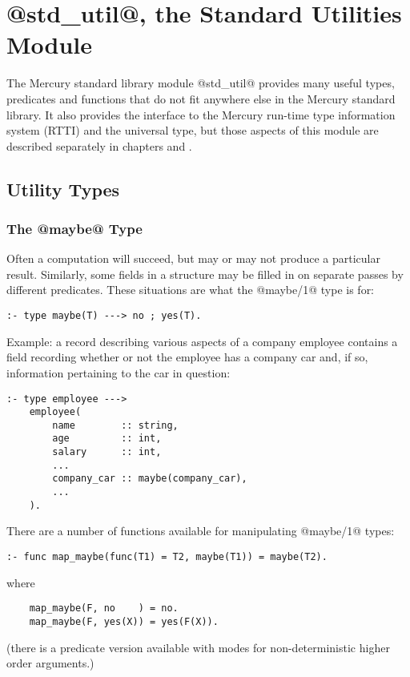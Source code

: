 


\chapter{@std\_util@, the Standard Utilities Module}

The Mercury standard library module @std_util@ provides many useful
types, predicates and functions that do not fit anywhere else in the
Mercury standard library.  It also provides the interface to the Mercury
run-time type information system (RTTI) and the universal type, but
those aspects of this module are described separately in chapters
 and .

\section{Utility Types}

\subsection{The @maybe@ Type}

Often a computation will succeed, but may or may not produce a
particular result.  Similarly, some fields in a structure may be filled
in on separate passes by different predicates.  These situations are
what the @maybe/1@ type is for:
\begin{verbatim}
:- type maybe(T) ---> no ; yes(T).
\end{verbatim}
Example: a record describing various aspects of a company employee
contains a field recording whether or not the employee has a company car
and, if so, information pertaining to the car in question:
\begin{verbatim}
:- type employee --->
    employee(
        name        :: string,
        age         :: int,
        salary      :: int,
        ...
        company_car :: maybe(company_car),
        ...
    ).
\end{verbatim}

There are a number of functions available for manipulating @maybe/1@
types:
\begin{verbatim}
:- func map_maybe(func(T1) = T2, maybe(T1)) = maybe(T2).
\end{verbatim}
where
\begin{verbatim}
    map_maybe(F, no    ) = no.
    map_maybe(F, yes(X)) = yes(F(X)).
\end{verbatim}
(there is a predicate version available with modes for non-deterministic
higher order arguments.)

